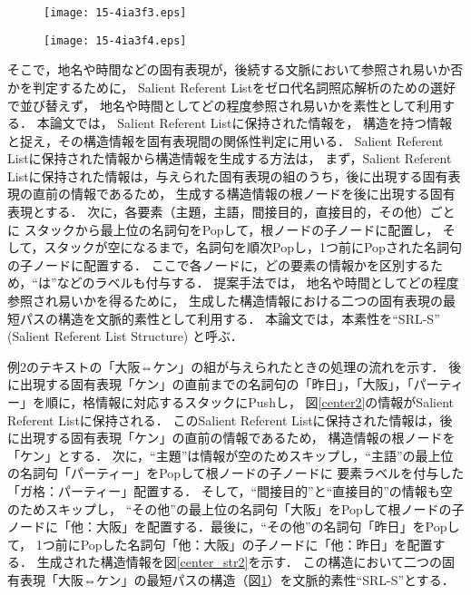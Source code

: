 \documentclass[japanese]{jnlp_1.4}
\begin{document}
\begin{figure}[t]
\setlength{\captionwidth}{0.48\textwidth}
\begin{minipage}[b]{0.48\hsize}
\begin{center}
\texttt{[image: 15-4ia3f3.eps]}
\end{center}
  \label{center_str2}
  \end{minipage}
\hfill
  \begin{minipage}[b]{0.48\hsize}
  \begin{center}
  \texttt{[image: 15-4ia3f4.eps]}
  \end{center}
  \label{feature2}
  \end{minipage}
\end{figure}

そこで，地名や時間などの固有表現が，後続する文脈において参照され易いか否かを判定するために，
Salient Referent Listをゼロ代名詞照応解析のための選好で並び替えず，
地名や時間としてどの程度参照され易いかを素性として利用する．
本論文では，
Salient Referent Listに保持された情報を，
構造を持つ情報と捉え，その構造情報を固有表現間の関係性判定に用いる．
Salient Referent Listに保持された情報から構造情報を生成する方法は，
まず，Salient Referent Listに保持された情報は，与えられた固有表現の組のうち，後に出現する固有表現の直前の情報であるため，
生成する構造情報の根ノードを後に出現する固有表現とする．
次に，各要素（主題，主語，間接目的，直接目的，その他）ごとに
スタックから最上位の名詞句をPopして，根ノードの子ノードに配置し，
そして，スタックが空になるまで，名詞句を順次Popし，1つ前にPopされた名詞句の子ノードに配置する．
ここで各ノードに，どの要素の情報かを区別するため，``は''などのラベルも付与する．
提案手法では，
地名や時間としてどの程度参照され易いかを得るために，
生成した構造情報における二つの固有表現の最短パスの構造を文脈的素性として利用する．
本論文では，本素性を``SRL-S'' (Salient Referent List Structure) と呼ぶ．

例2のテキストの「大阪⇔ケン」の組が与えられたときの処理の流れを示す．
後に出現する固有表現「ケン」の直前までの名詞句の「昨日」，「大阪」，「パーティー」を順に，格情報に対応するスタックにPushし，
図{\ref{center2}}の情報がSalient Referent Listに保持される．
このSalient Referent Listに保持された情報は，後に出現する固有表現「ケン」の直前の情報であるため，
構造情報の根ノードを「ケン」とする．
次に，``主題''は情報が空のためスキップし，``主語''の最上位の名詞句「パーティー」をPopして根ノードの子ノードに
要素ラベルを付与した「ガ格：パーティー」配置する．
そして，``間接目的''と``直接目的''の情報も空のためスキップし，
``その他''の最上位の名詞句「大阪」をPopして根ノードの子ノードに「他：大阪」を配置する．最後に，``その他''の名詞句「昨日」をPopして，
1つ前にPopした名詞句「他：大阪」の子ノードに「他：昨日」を配置する．
生成された構造情報を図{\ref{center_str2}}を示す．
この構造において二つの固有表現「大阪⇔ケン」の最短パスの構造（図{\ref{feature2}}）を文脈的素性``SRL-S''とする．
\end{document}
